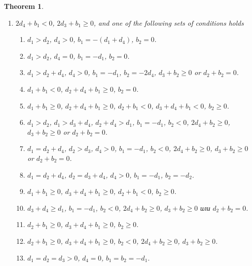 \documentclass[12pt]{amsart}
\makeatletter
\newcommand{\symbitem}[1]{\item[#1]%
\renewcommand{\@currentlabel}{#1}\ignorespaces}
\newtheorem{theorem}[equation]{Theorem}
\theoremstyle{definition}
\theoremstyle{remark}
\makeatother
\begin{document}
\begin{theorem}
\begin{enumerate}
\item\label{y4} $2d_4+b_1<0$, $2d_3+b_1\geqslant 0$, and one of the following 
sets of conditions holds
\begin{enumerate}
\item%
\label{y4case1} $d_1>d_2$, $d_4>0$, $b_1=-(d_1+d_4)$, $b_2=0$.
\item%
\label{y4case2} $d_1>d_2$, $d_4=0$, $b_1=-d_1$, $b_2=0$. 
\item%
\label{y4case3} $d_1>d_2+d_4$, $d_4>0$, 
$b_1=-d_1$, $b_2=-2d_4$, $d_3+b_2\geqslant 0$ or $d_2+b_2=0$.
\item%
\label{y4case4} $d_1+b_1<0$, $d_2+d_4+b_1\geqslant 0$, $b_2=0$.
\item%
\label{y4case5} $d_1+b_1\geqslant 0$, $d_2+d_4+b_1\geqslant 0$, $d_2+b_1<0$, 
$d_3+d_4+b_1<0$, $b_2\geqslant 0$.
\item%
\label{y4case6} $d_1>d_2$, $d_1>d_3+d_4$, $d_2+d_4>d_1$,
$b_1=-d_1$, $b_2<0$, $2d_4+b_2\geqslant 0$, $d_3+b_2\geqslant 0$ or 
$ d_2+b_2=0$.
\item%
\label{y4case7} $d_1=d_2+d_4$, $d_2>d_3$, $d_4>0$, $b_1=-d_1$, $b_2<0$,
$2d_4+b_2\geqslant 0$, $d_3+b_2\geqslant 0$ or $d_2+b_2=0$.
\item%
\label{y4case8} $d_1=d_2+d_4$, $d_2=d_3+d_4$, $d_4>0$, 
$b_1=-d_1$, $b_2=-d_2$.
\item%
\label{y4case9} $d_1+b_1\geqslant 0$, $d_3+d_4+b_1\geqslant 0$, $d_2+b_1<0$, 
$b_2\geqslant 0$. 
\item%
\label{y4case10} $d_3+d_4\geqslant d_1$, $b_1=-d_1$, 
$b_2<0$, $2d_4+b_2\geqslant 0$,
$d_3+b_2\geqslant 0$ или $d_2+b_2=0$.
\item%
\label{y4case11} $d_2+b_1\geqslant 0$, $d_3+d_4+b_1\geqslant 0$, $b_2\geqslant 0$. 
\item%
\label{y4case12} $d_2+b_1\geqslant 0$, $d_3+d_4+b_1\geqslant 0$, $b_2<0$, 
$2d_4+b_2\geqslant 0$, $d_3+b_2\geqslant 0$.
\item%
\label{y4case13} $d_1=d_2=d_3>0$, $d_4=0$, $b_1=b_2=-d_1$.
\end{enumerate}


\end{enumerate}
\end{theorem}
\end{document}
